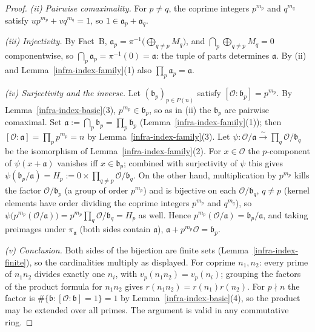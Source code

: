 \begin{proof}
  \emph{(ii) Pairwise comaximality.} For $p \ne q$, the coprime integers $p^{m_p}$ and
  $q^{m_q}$ satisfy $u p^{m_p} + v q^{m_q} = 1$, so
  $1 \in \mathfrak{a}_p + \mathfrak{a}_q$.

  \emph{(iii) Injectivity.} By Fact~B,
  $\mathfrak{a}_p = \pi^{-1}\bigl(\bigoplus_{q \ne p} M_q\bigr)$, and
  $\bigcap_{p} \bigoplus_{q \ne p} M_q = 0$ componentwise, so
  $\bigcap_p \mathfrak{a}_p = \pi^{-1}(0) = \mathfrak{a}$: the tuple of parts determines
  $\mathfrak{a}$. By (ii) and Lemma~\ref{infra-index-family}(1) also
  $\prod_p \mathfrak{a}_p = \mathfrak{a}$.

  \emph{(iv) Surjectivity and the inverse.} Let $(\mathfrak{b}_p)_{p \in P(n)}$ satisfy
  $[\mathcal{O} : \mathfrak{b}_p] = p^{m_p}$. By Lemma~\ref{infra-index-basic}(3),
  $p^{m_p} \in \mathfrak{b}_p$, so as in (ii) the $\mathfrak{b}_p$ are pairwise comaximal.
  Set $\mathfrak{a} := \bigcap_p \mathfrak{b}_p = \prod_p \mathfrak{b}_p$
  (Lemma~\ref{infra-index-family}(1)); then
  $[\mathcal{O} : \mathfrak{a}] = \prod_p p^{m_p} = n$ by
  Lemma~\ref{infra-index-family}(3). Let
  $\psi : \mathcal{O}/\mathfrak{a} \xrightarrow{\sim} \prod_q \mathcal{O}/\mathfrak{b}_q$
  be the isomorphism of Lemma~\ref{infra-index-family}(2). For $x \in \mathcal{O}$ the
  $p$-component of $\psi(x + \mathfrak{a})$ vanishes iff $x \in \mathfrak{b}_p$; combined
  with surjectivity of $\psi$ this gives
  $\psi(\mathfrak{b}_p/\mathfrak{a}) = H_p := 0 \times \prod_{q \ne p}
  \mathcal{O}/\mathfrak{b}_q$. On the other hand, multiplication by $p^{m_p}$ kills the
  factor $\mathcal{O}/\mathfrak{b}_p$ (a group of order $p^{m_p}$) and is bijective on each
  $\mathcal{O}/\mathfrak{b}_q$, $q \ne p$ (kernel elements have order dividing the coprime
  integers $p^{m_p}$ and $q^{m_q}$), so
  $\psi\bigl(p^{m_p}(\mathcal{O}/\mathfrak{a})\bigr) = p^{m_p}\prod_q
  \mathcal{O}/\mathfrak{b}_q = H_p$ as well. Hence
  $p^{m_p}(\mathcal{O}/\mathfrak{a}) = \mathfrak{b}_p/\mathfrak{a}$, and taking preimages
  under $\pi_{\mathfrak{a}}$ (both sides contain $\mathfrak{a}$),
  $\mathfrak{a} + p^{m_p}\mathcal{O} = \mathfrak{b}_p$.

  \emph{(v) Conclusion.} Both sides of the bijection are finite sets
  (Lemma~\ref{infra-index-finite}), so the cardinalities multiply as displayed. For coprime
  $n_1, n_2$: every prime of $n_1 n_2$ divides exactly one $n_i$, with
  $v_p(n_1 n_2) = v_p(n_i)$; grouping the factors of the product formula for $n_1 n_2$
  gives $r(n_1 n_2) = r(n_1) r(n_2)$. For $p \nmid n$ the factor is
  $\#\{\mathfrak{b} : [\mathcal{O} : \mathfrak{b}] = 1\} = 1$ by
  Lemma~\ref{infra-index-basic}(4), so the product may be extended over all primes. The
  argument is valid in any commutative ring.
\end{proof}

